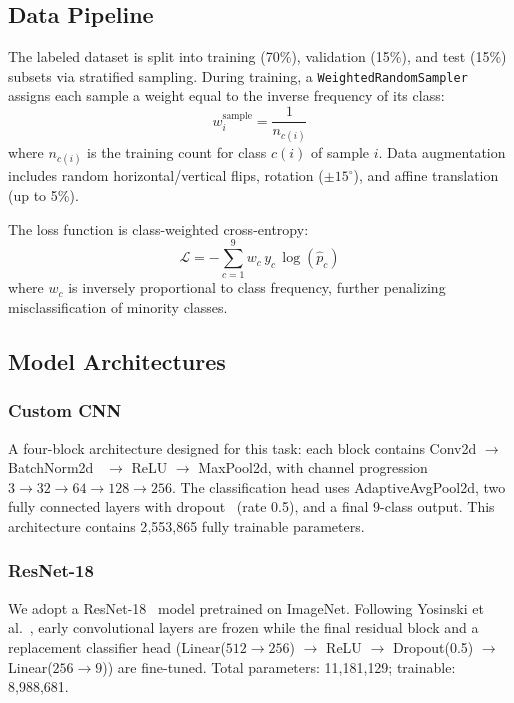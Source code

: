 \documentclass[conference]{IEEEtran}
\begin{document}
\subsection{Data Pipeline}

The labeled dataset is split into training (70\%), validation (15\%), and test
(15\%) subsets via stratified sampling. During training, a
\texttt{WeightedRandomSampler} assigns each sample a weight equal to the
inverse frequency of its class:
\begin{equation}
w_i^{\text{sample}} = \frac{1}{n_{c(i)}}
\label{eq:sample_weight}
\end{equation}
where $n_{c(i)}$ is the training count for class $c(i)$ of sample $i$.
Data augmentation includes random horizontal/vertical flips, rotation
($\pm 15^\circ$), and affine translation (up to 5\%).

The loss function is class-weighted cross-entropy:
\begin{equation}
\mathcal{L} = -\sum_{c=1}^{9} w_c \, y_c \, \log(\hat{p}_c)
\label{eq:weighted_ce}
\end{equation}
where $w_c$ is inversely proportional to class frequency, further penalizing
misclassification of minority classes.

\subsection{Model Architectures}

\subsubsection{Custom CNN}
A four-block architecture designed for this task: each block contains
Conv2d $\to$ BatchNorm2d~\cite{ioffe2015} $\to$ ReLU $\to$ MaxPool2d, with
channel progression $3 \to 32 \to 64 \to 128 \to 256$. The classification
head uses AdaptiveAvgPool2d, two fully connected layers with
dropout~\cite{srivastava2014} (rate 0.5), and a final 9-class output.
This architecture contains 2{,}553{,}865 fully trainable parameters.

\subsubsection{ResNet-18}
We adopt a ResNet-18~\cite{he2016} model pretrained on ImageNet. Following
Yosinski et al.~\cite{yosinski2014}, early convolutional layers are frozen
while the final residual block and a replacement classifier head
(Linear($512 \to 256$) $\to$ ReLU $\to$ Dropout(0.5) $\to$ Linear($256 \to
9$)) are fine-tuned. Total parameters: 11{,}181{,}129; trainable:
8{,}988{,}681.
\end{document}
